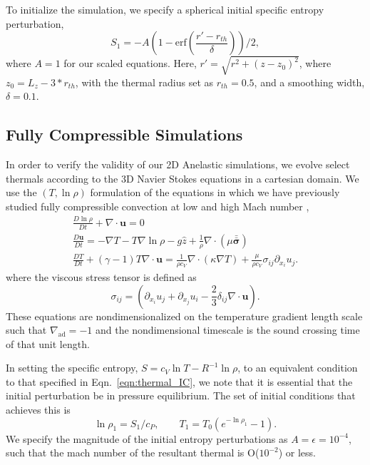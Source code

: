 \documentclass[twocolumn, amsmath, amsfonts, amssymb, trackchanges]{aastex62}
\newcommand{\DivU}{\ensuremath{\nabla\cdot\bm{u}}}
\newcommand{\grad}{\ensuremath{\nabla}}
\newcommand{\lilstressT}{\ensuremath{\bm{\bar{\bar{\sigma}}}}}
\begin{document}
To initialize the simulation, we specify a spherical initial specific entropy perturbation,
\begin{equation}
S_1 = - A(1 - \text{erf}\left(\frac{r' - r_{th}}{\delta}\right))/2,
\label{eqn:thermal_IC}
\end{equation}
where $A = 1$ for our scaled equations.
Here, $r' = \sqrt{r^2 + (z - z_0)^2}$, where $z_0 = L_z - 3*r_{th}$,
with the thermal radius set as $r_{th} = 0.5$, and a smoothing width, $\delta = 0.1$.



\subsection{Fully Compressible Simulations}
In order to verify the validity of our 2D Anelastic simulations, we evolve select
thermals according to the 3D Navier Stokes equations in a cartesian domain. We use
the $(T, \ln\rho)$ formulation of the equations in which we have previously studied fully compressible
convection at low and high Mach number \citep{anders&brown2017, lecoanet&all2014},
\begin{gather}
\frac{D \ln\rho}{Dt} + \DivU = 0 \\
\frac{D \bm{u}}{D t} = -\grad T - T\grad\ln\rho - g\hat{z} + \frac{1}{\rho}\grad\cdot\left(\mu\lilstressT\right) \\
\frac{D T}{Dt} + (\gamma-1)T\DivU  = \frac{1}{\rho c_V}\grad\cdot\left(\kappa \grad T\right) + \frac{\mu}{\rho c_V}\sigma_{ij}\partial_{x_i}u_j.
\end{gather}
where the viscous stress tensor is defined as
\begin{equation}
\sigma_{ij} = \left(\partial_{x_i}u_j + \partial_{x_j}u_i - \frac{2}{3}\delta_{ij}\grad\cdot\bm{u}\right).
\end{equation}
These equations are nondimensionalized on the temperature gradient length scale such that
$\grad_{\text{ad}} = -1$ and the nondimensional timescale is the sound crossing time of that
unit length.  

In setting the specific entropy, $S = c_V \ln T - R^{-1}\ln\rho$, to an equivalent condition
to that specified in  Eqn.~\ref{eqn:thermal_IC}, we note that it is essential that the
initial perturbation be in pressure equilibrium. The set of initial conditions that achieves this
is
\begin{equation}
\ln\rho_1 = S_1/c_P, \qquad T_1 = T_0(e^{-\ln\rho_1} - 1).
\end{equation}
We specify the magnitude of the initial entropy perturbations as 
$A = \epsilon = 10^{-4}$, such that the mach number of the resultant thermal is O($10^{-2}$) or less.
\end{document}
